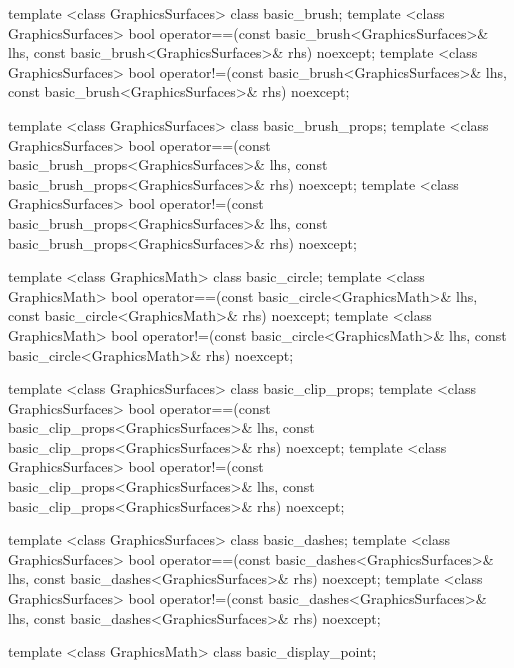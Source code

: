 \begin{codeblock}
{{{{    template <class GraphicsSurfaces>
    class basic_brush;
    template <class GraphicsSurfaces>
    bool operator==(const basic_brush<GraphicsSurfaces>& lhs,
      const basic_brush<GraphicsSurfaces>& rhs) noexcept;
    template <class GraphicsSurfaces>
    bool operator!=(const basic_brush<GraphicsSurfaces>& lhs,
      const basic_brush<GraphicsSurfaces>& rhs) noexcept;

    template <class GraphicsSurfaces>
    class basic_brush_props;
    template <class GraphicsSurfaces>
    bool operator==(const basic_brush_props<GraphicsSurfaces>& lhs,
      const basic_brush_props<GraphicsSurfaces>& rhs) noexcept;
    template <class GraphicsSurfaces>
    bool operator!=(const basic_brush_props<GraphicsSurfaces>& lhs,
      const basic_brush_props<GraphicsSurfaces>& rhs) noexcept;
    
    template <class GraphicsMath>
    class basic_circle;
    template <class GraphicsMath>
    bool operator==(const basic_circle<GraphicsMath>& lhs,
      const basic_circle<GraphicsMath>& rhs) noexcept;
    template <class GraphicsMath>
    bool operator!=(const basic_circle<GraphicsMath>& lhs,
      const basic_circle<GraphicsMath>& rhs) noexcept;
    
    template <class GraphicsSurfaces>
    class basic_clip_props;
    template <class GraphicsSurfaces>
    bool operator==(const basic_clip_props<GraphicsSurfaces>& lhs,
      const basic_clip_props<GraphicsSurfaces>& rhs) noexcept;
    template <class GraphicsSurfaces>
    bool operator!=(const basic_clip_props<GraphicsSurfaces>& lhs,
      const basic_clip_props<GraphicsSurfaces>& rhs) noexcept;
    
    template <class GraphicsSurfaces>
    class basic_dashes;
    template <class GraphicsSurfaces>
    bool operator==(const basic_dashes<GraphicsSurfaces>& lhs,
      const basic_dashes<GraphicsSurfaces>& rhs) noexcept;
    template <class GraphicsSurfaces>
    bool operator!=(const basic_dashes<GraphicsSurfaces>& lhs,
      const basic_dashes<GraphicsSurfaces>& rhs) noexcept;
    
    template <class GraphicsMath>
    class basic_display_point;
    
}}}}
\end{codeblock}
